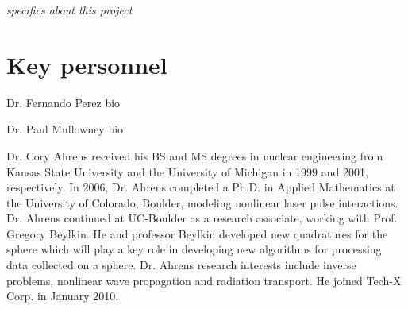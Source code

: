 \documentclass[10pt]{article}
\begin{document}
\emph{specifics about this project}

\section*{Key personnel}

Dr. Fernando Perez bio

Dr. Paul Mullowney bio

Dr. Cory Ahrens received his BS and MS degrees in nuclear engineering from Kansas State University and the University of Michigan in 1999 and 2001, respectively. In 2006, Dr. Ahrens completed a Ph.D. in Applied Mathematics at the University of Colorado, Boulder, modeling nonlinear laser pulse interactions. Dr. Ahrens continued at UC-Boulder as a research associate, working with Prof. Gregory Beylkin. He and professor Beylkin developed new quadratures for the sphere which will play a key role in developing new algorithms for processing data collected on a sphere. Dr. Ahrens research interests include inverse problems, nonlinear wave propagation and radiation transport. He joined Tech-X Corp. in January 2010.



 
\end{document}
